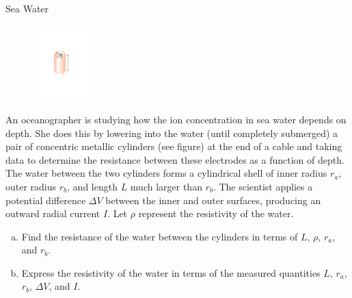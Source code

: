 \documentclass{esg8022pset}
\renewcommand{\d}{\,d}
\begin{document}
\begin{problem}{Sea Water} 
  \begin{figure}
    \begin{center}\includegraphics[width=0.20\textwidth]{ps06_02_01.pdf}\end{center}
  \end{figure}
  An oceanographer is studying how the ion concentration in sea water depends on depth. She does this by lowering into the water (until completely submerged) a pair of concentric metallic cylinders (see figure) at the end of a cable and taking data to determine the resistance between these electrodes as a function of depth. The water between the two cylinders forms a cylindrical shell of inner radius $r_a$, outer radius $r_b$, and length $L$ much larger than $r_b$. The scientist applies a potential difference $\Delta V$ between the inner and outer surfaces, producing an outward radial current $I$. Let $\rho$ represent the resistivity of the water.
  \begin{enumerate}[(a)]
    \item Find the resistance of the water between the cylinders in terms of $L$, $\rho$, $r_a$, and $r_b$.
    \item Express the resistivity of the water in terms of the measured quantities $L$, $r_a$, $r_b$, $\Delta V$, and $I$.
  \end{enumerate}
\end{problem}
\begin{solution}

\end{solution}
\end{document}
